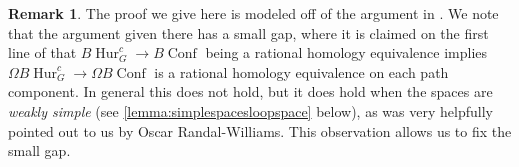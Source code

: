 \documentclass[12 pt]{amsart}
\theoremstyle{plain}
\theoremstyle{definition}
\newtheorem{remark}[theorem]{Remark}
\theoremstyle{remark}
\numberwithin{equation}{section}
\DeclareMathOperator\im{im}
\DeclareMathOperator\Hur{Hur}
\DeclareMathOperator\Conf{Conf}
\newcommand\QQ{\mathbb{Q}}
\newcommand\ZZ{\mathbb{Z}}
\newcommand\PP{\mathbb{P}}
\newcommand\RR{\mathbb{R}}
\begin{document}
\begin{remark}
	The proof we give here is modeled off of the argument in \cite[Corollary
	5.4]{randal-williams:homology-of-hurwitz-spaces}. We note that the
	argument given there has a small gap, 
	where it is claimed on the first line of \cite[p.
	15]{randal-williams:homology-of-hurwitz-spaces} that $B\Hur^c_G \to
	B\Conf$ being a rational homology equivalence implies $\Omega B \Hur^c_G \to \Omega B
	\Conf$ is a rational homology equivalence on each path component.
	In general this does not hold, but it does hold when the spaces are \textit{weakly simple} (see \autoref{lemma:simplespacesloopspace} below), as was very helpfully pointed out to us by Oscar
	Randal-Williams.
	This observation allows us to fix the small gap.
%
\end{remark}
\end{document}
